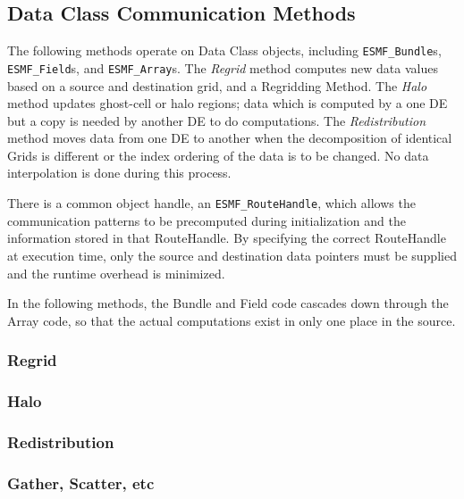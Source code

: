 \subsection{Data Class Communication Methods}

The following methods operate on Data Class objects, including
{\tt ESMF\_Bundle}s, {\tt ESMF\_Field}s, and {\tt ESMF\_Array}s.
The {\it Regrid} method computes new data values based on a source
and destination grid, and a Regridding Method.  The {\it Halo} 
method updates ghost-cell or halo regions; data which is computed
by a one DE but a copy is needed by another DE to do computations.
The {\it Redistribution} method moves data from one DE to another
when the decomposition of identical Grids is different or the
index ordering of the data is to be changed.  No data
interpolation is done during this process.

There is a common object handle, an {\tt ESMF\_RouteHandle}, which
allows the communication patterns to be precomputed during initialization
and the information stored in that RouteHandle.
By specifying the correct RouteHandle at execution time, only
the source and destination data pointers must be supplied and the
runtime overhead is minimized.

In the following methods, the Bundle and Field code cascades down
through the Array code, so that the actual computations exist in
only one place in the source.

\subsubsection{Regrid}



\subsubsection{Halo}



\subsubsection{Redistribution}



\subsubsection{Gather, Scatter, etc}

